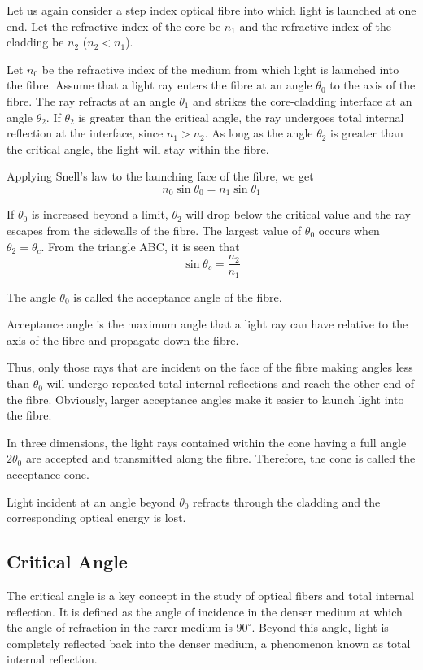 \documentclass{article}
\theoremstyle{mytheoremstyle}
\theoremstyle{mytheoremstyle}
\theoremstyle{myproblemstyle}
\begin{document}
Let us again consider a step index optical fibre into which light is launched at one end. Let the refractive index of the core be \(n_{1}\) and the refractive index of the cladding be \(n_{2}\) (\(n_{2} < n_{1}\)).

Let \(n_{0}\) be the refractive index of the medium from which light is launched into the fibre. Assume that a light ray enters the fibre at an angle \(\theta_{0}\) to the axis of the fibre. The ray refracts at an angle \(\theta_{1}\) and strikes the core-cladding interface at an angle \(\theta_{2}\). If \(\theta_{2}\) is greater than the critical angle, the ray undergoes total internal reflection at the interface, since \(n_{1} > n_{2}\). As long as the angle \(\theta_{2}\) is greater than the critical angle, the light will stay within the fibre.

Applying Snell's law to the launching face of the fibre, we get
\[
n_{0} \sin \theta_{0} = n_{1} \sin \theta_{1}
\]

If \(\theta_{0}\) is increased beyond a limit, \(\theta_{2}\) will drop below the critical value and the ray escapes from the sidewalls of the fibre. The largest value of \(\theta_{0}\) occurs when \(\theta_{2} = \theta_{c}\). From the triangle ABC, it is seen that
\[
\sin \theta_{c} = \frac{n_{2}}{n_{1}}
\]

The angle \(\theta_{0}\) is called the acceptance angle of the fibre.

Acceptance angle is the maximum angle that a light ray can have relative to the axis of the fibre and propagate down the fibre.

Thus, only those rays that are incident on the face of the fibre making angles less than \(\theta_{0}\) will undergo repeated total internal reflections and reach the other end of the fibre. Obviously, larger acceptance angles make it easier to launch light into the fibre.

In three dimensions, the light rays contained within the cone having a full angle \(2\theta_{0}\) are accepted and transmitted along the fibre. Therefore, the cone is called the acceptance cone.

Light incident at an angle beyond \(\theta_{0}\) refracts through the cladding and the corresponding optical energy is lost.


\subsection{Critical Angle}

The critical angle is a key concept in the study of optical fibers and total internal reflection. It is defined as the angle of incidence in the denser medium at which the angle of refraction in the rarer medium is \(90^\circ\). Beyond this angle, light is completely reflected back into the denser medium, a phenomenon known as total internal reflection.
\end{document}
